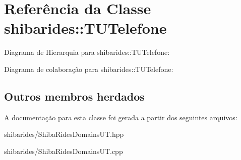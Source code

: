 \hypertarget{classshibarides_1_1TUTelefone}{}\section{Referência da Classe shibarides\+:\+:T\+U\+Telefone}
\label{classshibarides_1_1TUTelefone}


Diagrama de Hierarquia para shibarides\+:\+:T\+U\+Telefone\+:


Diagrama de colaboração para shibarides\+:\+:T\+U\+Telefone\+:
\subsection*{Outros membros herdados}


A documentação para esta classe foi gerada a partir dos seguintes arquivos\+:\begin{DoxyCompactItemize}
\item 
shibarides/Shiba\+Rides\+Domains\+U\+T.\+hpp\item 
shibarides/Shiba\+Rides\+Domains\+U\+T.\+cpp\end{DoxyCompactItemize}
